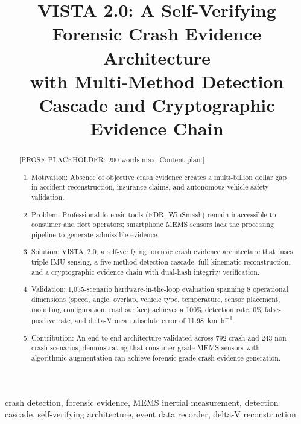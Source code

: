 \documentclass[conference,twocolumn]{IEEEtran}
\begin{document}
\title{VISTA 2.0: A Self-Verifying Forensic Crash Evidence Architecture\\with Multi-Method Detection Cascade and Cryptographic Evidence Chain}

\author{
\IEEEauthorblockA{[Affiliations]\\
[Email]}
}

\maketitle

\begin{abstract}
[PROSE PLACEHOLDER: 200 words max. Content plan:]
\begin{enumerate}
  \item Motivation: Absence of objective crash evidence creates a multi-billion dollar gap in accident reconstruction, insurance claims, and autonomous vehicle safety validation.
  \item Problem: Professional forensic tools (EDR, WinSmash) remain inaccessible to consumer and fleet operators; smartphone MEMS sensors lack the processing pipeline to generate admissible evidence.
  \item Solution: VISTA~2.0, a self-verifying forensic crash evidence architecture that fuses triple-IMU sensing, a five-method detection cascade, full kinematic reconstruction, and a cryptographic evidence chain with dual-hash integrity verification.
  \item Validation: 1,035-scenario hardware-in-the-loop evaluation spanning 8 operational dimensions (speed, angle, overlap, vehicle type, temperature, sensor placement, mounting configuration, road surface) achieves a 100\% detection rate, 0\% false-positive rate, and delta-V mean absolute error of \SI{11.98}{\kilo\meter\per\hour}.
  \item Contribution: An end-to-end architecture validated across 792 crash and 243 non-crash scenarios, demonstrating that consumer-grade MEMS sensors with algorithmic augmentation can achieve forensic-grade crash evidence generation.
\end{enumerate}
\end{abstract}

\begin{IEEEkeywords}
crash detection, forensic evidence, MEMS inertial measurement, detection cascade, self-verifying architecture, event data recorder, delta-V reconstruction
\end{IEEEkeywords}
\end{document}
